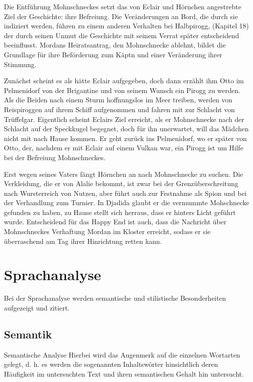 Die Entführung Mohnschneckes setzt das von Eclair und Hörnchen angestrebte Ziel der Geschichte: ihre Befreiung.  Die Veränderungen an Bord, die durch sie indiziert werden, führen zu einem anderen Verhalten bei Halbpirogg, (Kapitel 18) der durch seinen Unmut die Geschichte mit seinem Verrat später entscheidend beeinflusst. Mordans Heiratsantrag, den Mohnschnecke ablehnt, bildet die Grundlage für ihre Beförderung zum Käptn und einer Veränderung ihrer Stimmung. 

Zunächst scheint es als hätte Eclair aufgegeben, doch dann erzählt ihm Otto im Pelmenidorf von der Brigantine und von seinem Wunsch ein Pirogg zu werden. Als die Beiden nach einem Sturm hoffnungslos im Meer treiben, werden von Reispiroggen auf ihrem Schiff aufgenommen und fahren mit zur Schlacht von Trüffelgar. Eigentlich scheint Eclairs Ziel erreicht, als er Mohnschnecke nach der Schlacht auf der Speckkugel begegnet, doch für ihn unerwartet, will das Mädchen nicht mit nach Hause kommen. Er geht zurück ins Pelmenidorf, wo er später von Otto, der, nachdem er mit Eclair auf einem Vulkan war, ein Pirogg ist um Hilfe bei der Befreiung Mohnschneckes.

Erst wegen seines Vaters fängt Hörnchen an nach Mohnschnecke zu suchen. Die Verkleidung, die er von Alalie bekommt, ist zwar bei der Grenzüberschreitung nach Wursterreich von Nutzen, aber führt auch zur Festnahme als Spion und bei der Verhandlung zum Turnier. In Djadida glaubt er die vermummte Mohschnecke gefunden zu haben, zu Hause stellt sich herraus, dass er hinters Licht geführt wurde. 
Entscheidend für das Happy End ist auch, dass die Nachricht über Mohnschneckes Verhaftung Mordan im Kloster erreicht, sodass er sie überraschend am Tag ihrer Hinrichtung retten kann.


\section{Sprachanalyse}
 Bei der Sprachanalyse werden semantische und stilistische Besonderheiten aufgezeigt und zitiert.

\subsection{Semantik}

Semantische Analyse
Hierbei wird das Augenmerk auf die einzelnen Wortarten gelegt, d. h. es werden die sogenannten Inhaltswörter hinsichtlich deren Häufigkeit im untersuchten Text und ihren semantischen Gehalt hin untersucht. 

